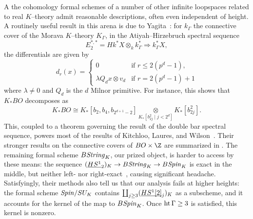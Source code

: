 \begin{remark}
A the cohomology formal schemes of a number of other infinite loopspaces related to real $K$--theory admit reasonable descriptions, often even independent of height.  A routinely useful result in this arena is due to Yagita~\cite[Lemma 2.1]{Yagita}: for $k_\Gamma$ the connective cover of the Morava $K$--theory $K_\Gamma$, in the Atiyah--Hirzebruch spectral sequence \[E_2^{*, *} = Hk^* X \otimes_k k_\Gamma^* \Rightarrow k_\Gamma^* X,\] the differentials are given by \[d_r(x) = \begin{cases} 0 & \text{if $r \le 2(p^d - 1)$}, \\ \lambda Q_d x \otimes v_d & \text{if $r = 2(p^d - 1) + 1$} \end{cases}\] where $\lambda \ne 0$ and $Q_d$ is the $d${\th} Milnor primitive.  For instance, this shows that $K_* BO$ decomposes as \[K_* BO \cong K_*[b_2, b_4, b_{2^{d+1}-2}] \underset{K_*[b_{2j}^2 \mid j < 2^d]}{\otimes} K_*[b_{2j}^2].\]  This, coupled to a theorem governing the result of the double bar spectral sequence, powers most of the results of Kitchloo, Laures, and Wilson~\cite[Section 4]{KLW}.  Their stronger results on the connective covers of $BO \times \Z$ are summarized in .  The remaining formal scheme $B\mathit{String}_K$, our prized object, is harder to access by these means: the sequence $(\underline{\smash{HS^1}}_{2})_K \to B\mathit{String}_K \to B\mathit{Spin}_K$ is exact in the middle, but neither left- nor right-exact~\cite[pg.\ 234]{KLW}, causing significant headache.  Satisfyingly, their methods also tell us that our analysis fails at higher heights: the formal scheme $\mathit{Spin}/SU_K$ contains $\coprod_{j \ge 3} (\underline{\smash{HS^1[2]}}_{j})_K$ as a subscheme, and it accounts for the kernel of the map to $B\mathit{Spin}_K$.  Once $\operatorname{ht} \Gamma \ge 3$ is satisfied, this kernel is nonzero.
\end{remark}

